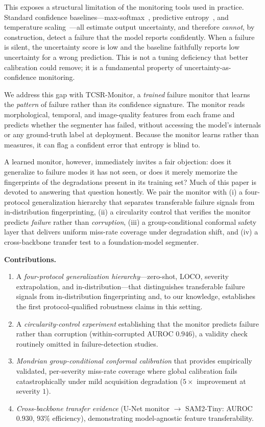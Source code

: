 \documentclass[letterpaper, 10 pt, conference]{ieeeconf}  %
\newcommand{\monitor}{TCSR-Monitor}
\newcommand{\unet}{U-Net}
\begin{document}
This exposes a structural limitation of the monitoring tools used in
practice. Standard confidence baselines---max-softmax~\cite{ref:hendrycks},
predictive entropy~\cite{ref:malinin}, and temperature
scaling~\cite{ref:guo}---all estimate output uncertainty, and therefore
\emph{cannot}, by construction, detect a failure that the model reports
confidently. When a failure is silent, the uncertainty score is low and the
baseline faithfully reports low uncertainty for a wrong prediction. This is
not a tuning deficiency that better calibration could remove; it is a
fundamental property of uncertainty-as-confidence monitoring.

We address this gap with \monitor{}, a \emph{trained} failure monitor that
learns the \emph{pattern} of failure rather than its confidence signature.
The monitor reads morphological, temporal, and image-quality features from
each frame and predicts whether the segmenter has failed, without accessing
the model's internals or any ground-truth label at deployment. Because the
monitor learns rather than measures, it can flag a confident error that
entropy is blind to.

A learned monitor, however, immediately invites a fair objection: does it
generalize to failure modes it has not seen, or does it merely memorize the
fingerprints of the degradations present in its training set? Much of this
paper is devoted to answering that question honestly. We pair the monitor
with (i) a four-protocol generalization hierarchy that separates transferable
failure signals from in-distribution fingerprinting, (ii) a circularity
control that verifies the monitor predicts \emph{failure} rather than
\emph{corruption}, (iii) a group-conditional conformal safety layer that
delivers uniform miss-rate coverage under degradation shift, and (iv) a
cross-backbone transfer test to a foundation-model segmenter.

\noindent\textbf{Contributions.}
\begin{enumerate}
\item A \emph{four-protocol generalization hierarchy}---zero-shot, LOCO,
severity extrapolation, and in-distribution---that distinguishes transferable
failure signals from in-distribution fingerprinting and, to our knowledge,
establishes the first protocol-qualified robustness claims in this setting.
\item A \emph{circularity-control experiment} establishing that the monitor
predicts failure rather than corruption (within-corrupted AUROC $0.946$), a
validity check routinely omitted in failure-detection studies.
\item \emph{Mondrian group-conditional conformal calibration} that provides
empirically validated, per-severity miss-rate coverage where global
calibration fails catastrophically under mild acquisition degradation
($5\times$ improvement at severity $1$).
\item \emph{Cross-backbone transfer evidence} (\unet{} monitor
$\rightarrow$ SAM2-Tiny: AUROC $0.930$, $93\%$ efficiency), demonstrating
model-agnostic feature transferability.
\end{enumerate}
\end{document}
